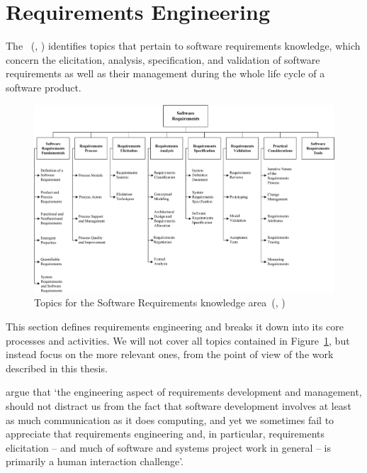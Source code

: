 \documentclass[dissertation,final]{softeng}
\begin{document}
\section{Requirements Engineering}
\label{sec:requirements_eng}
The \emph{}~(, \citeyear{SWEBOK}) identifies topics that pertain to software requirements knowledge, which concern the elicitation, analysis, specification, and validation of software requirements as well as their management during the whole life cycle of a software product.


\begin{figure}
\includegraphics[width=\columnwidth]{swebooksoftwarerequirements}
\centering
\caption[Topics for software requirements]{Topics for the Software Requirements knowledge area~(, \citeyear{SWEBOK})}
\label{fig:swebook_software_requirements}
\end{figure}

This section defines requirements engineering and breaks it down into its core processes and activities. We will not cover all topics contained in Figure~\ref{fig:swebook_software_requirements}, but instead focus on the more relevant ones, from the point of view of the work described in this thesis. 

\citet{Wiegers2013} argue that `the engineering aspect of requirements development and management, should not distract us from the fact that software development involves at least as much communication as it does computing, and yet we sometimes fail to appreciate that requirements engineering and, in particular, requirements elicitation -- and much of software and systems project work in general -- is primarily a human interaction challenge'. 
\end{document}
